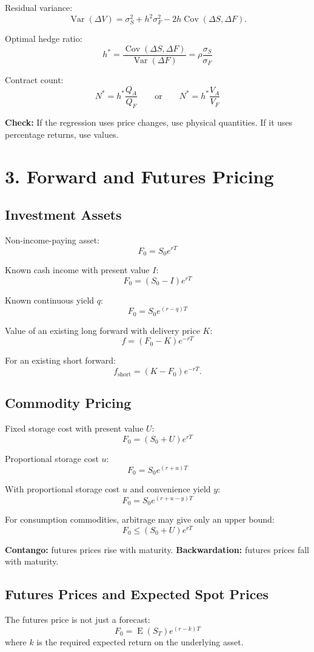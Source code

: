 \documentclass[10pt]{article}
\DeclareMathOperator{\Var}{Var}
\DeclareMathOperator{\Cov}{Cov}
\DeclareMathOperator{\E}{E}
\newcommand{\formula}[1]{\[
    \boxed{\displaystyle #1}
\]}
\newcommand{\note}[1]{\textcolor{accent}{\textbf{Check:}} #1}
\begin{document}
\begin{multicols}{2}
Residual variance:
\[
    \Var(\Delta V)=\sigma_S^2+h^2\sigma_F^2-2h\Cov(\Delta S,\Delta F).
\]

Optimal hedge ratio:
\formula{h^*=\frac{\Cov(\Delta S,\Delta F)}{\Var(\Delta F)}
=\rho\frac{\sigma_S}{\sigma_F}}

Contract count:
\formula{N^*=h^*\frac{Q_A}{Q_F}
\qquad\text{or}\qquad
N^*=h^*\frac{V_A}{V_F}}

\note{If the regression uses price changes, use physical quantities. If it uses percentage returns, use values.}

\section*{3. Forward and Futures Pricing}

\subsection*{Investment Assets}
Non-income-paying asset:
\formula{F_0=S_0e^{rT}}

Known cash income with present value $I$:
\formula{F_0=(S_0-I)e^{rT}}

Known continuous yield $q$:
\formula{F_0=S_0e^{(r-q)T}}

Value of an existing long forward with delivery price $K$:
\formula{f=(F_0-K)e^{-rT}}

For an existing short forward:
\[
    f_{\text{short}}=(K-F_0)e^{-rT}.
\]

\subsection*{Commodity Pricing}
Fixed storage cost with present value $U$:
\formula{F_0=(S_0+U)e^{rT}}

Proportional storage cost $u$:
\formula{F_0=S_0e^{(r+u)T}}

With proportional storage cost $u$ and convenience yield $y$:
\formula{F_0=S_0e^{(r+u-y)T}}

For consumption commodities, arbitrage may give only an upper bound:
\formula{F_0\leq (S_0+U)e^{rT}}

\textbf{Contango:} futures prices rise with maturity. \textbf{Backwardation:} futures prices fall with maturity.

\subsection*{Futures Prices and Expected Spot Prices}
The futures price is not just a forecast:
\formula{F_0=\E(S_T)e^{(r-k)T}}
where $k$ is the required expected return on the underlying asset.


\end{multicols}
\end{document}
